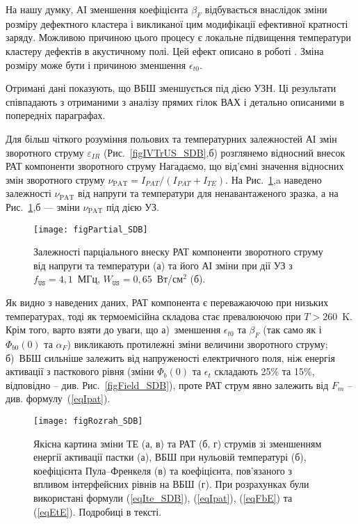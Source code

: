 На нашу думку, АІ зменшення коефіцієнта $\beta_F$ відбувається внаслідок зміни розміру дефектного кластера і викликаної цим
модифікації ефективної кратності заряду.
Можливою причиною цього процесу є локальне підвищення температури кластеру дефектів в акустичному полі.
Цей ефект описано в роботі \cite{MirzadeJAP2011}.
Зміна розміру може бути і причиною зменшення $\epsilon_{t0}$.

Отримані дані показують, що ВБШ зменшується під дією УЗН.
Ці результати співпадають з отриманими з аналізу прямих гілок ВАХ і детально описаними в попередніх параграфах.

Для більш чіткого розуміння польових та температурних залежностей АІ змін зворотного струму $\varepsilon_{IR}$ (Рис.~\ref{figIVTrUS_SDB},б)
розглянемо відносний внесок РАТ компоненти зворотного струму
Нагадаємо, що від'ємні значення відносних змін зворотного струму
$\nu_\mathrm{PAT}=I_{P\!AT}/(I_{P\!AT}+I_{TE})$.
На Рис.~\ref{figPartial_SDB},a наведено залежності $\nu_\mathrm{PAT}$ від напруги та температури для ненавантаженого зразка,
а на Рис.~\ref{figPartial_SDB},б --- зміни $\nu_\mathrm{PAT}$ під дією УЗ.


\begin{figure}
\center
\texttt{[image: figPartial\_SDB]}
\caption{\label{figPartial_SDB}
Залежності парціального внеску РАТ компоненти зворотного струму від напруги та температури (а)
та його АІ зміни при дії УЗ з $f_\mathtt{US}=4,1$~МГц, $W_\mathtt{US}=0,65$~Вт/см$^2$ (б).
}%
\end{figure}

Як видно з наведених даних, РАТ компонента є переважаючою при низьких температурах, тоді як термоемісійна складова стає превалюючою при $T>260$~K.
Крім того, варто взяти до уваги, що
а)~зменшення $\epsilon_{t0}$ та $\beta_F$ (так само як і $\Phi_{b0}(0)$ та $\alpha_F$) викликають протилежні зміни величини зворотного струму;
б)~ВБШ сильніше залежить від напруженості електричного поля, ніж енергія активації з пасткового рівня
(зміни $\Phi_{b}(0)$ та $\epsilon_t$ складають 25\% та 15\%, відповідно -- див. Рис.~\ref{figField_SDB}),
проте РАТ струм явно залежить від $F_m$ -- див. формулу~(\ref{eqIpat}).



\begin{figure}
\center
\texttt{[image: figRozrah\_SDB]}
\caption{\label{figRozrah_SDB}
Якісна картина зміни ТЕ (а, в) та РАТ (б, г) струмів зі зменшенням енергії активації пастки (а),
ВБШ при нульовій температурі (б),
коефіцієнта Пула--Френкеля (в)
та коефіцієнта, пов'язаного з впливом інтерфейсних рівнів на ВБШ (г).
При розрахунках були використані формули (\ref{eqIte_SDB}), (\ref{eqIpat}), (\ref{eqFbE}) та (\ref{eqEtE}).
Подробиці в тексті.
}%
\end{figure}


